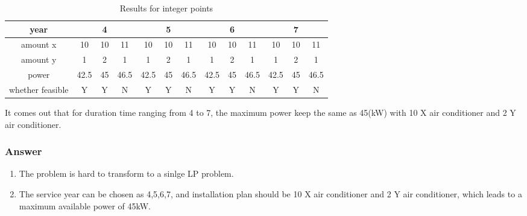 \documentclass[titlepage,a4paper]{article}
\begin{document}
        \begin{table}[H]
            \centering
        
            \begin{tabular}{c|ccc|ccc|ccc|ccc}
                \hline
                year             & \multicolumn{3}{c|}{4} & \multicolumn{3}{c|}{5} & \multicolumn{3}{c|}{6} & \multicolumn{3}{c}{7} \\ \hline
                amount x         & 10     & 10   & 11     & 10     & 10   & 11     & 10     & 10   & 11     & 10     & 10   & 11    \\
                amount y         & 1      & 2    & 1      & 1      & 2    & 1      & 1      & 2    & 1      & 1      & 2    & 1     \\
                power            & 42.5   & 45   & 46.5   & 42.5   & 45   & 46.5   & 42.5   & 45   & 46.5   & 42.5   & 45   & 46.5  \\ \hline
                whether feasible & Y      & Y    & N      & Y      & Y    & N      & Y      & Y    & N      & Y      & Y    & N     \\ \hline
            \end{tabular}

            \caption{Results for integer points}

        \end{table}

        It comes out that for duration time ranging from 4 to 7, the maximum power keep the same as 45(kW) with 10 X air conditioner and 2 Y air conditioner.        

        \subsubsection{Answer}
        \begin{enumerate}
            \item The problem is hard to transform to a sinlge LP problem.
            \item The service year can be chosen as 4,5,6,7, and installation plan should be 10 X air conditioner and 2 Y air conditioner, which leads to a maximum available power of 45kW.
        \end{enumerate}

\ifx \allfiles \undefined    
\end{document}
